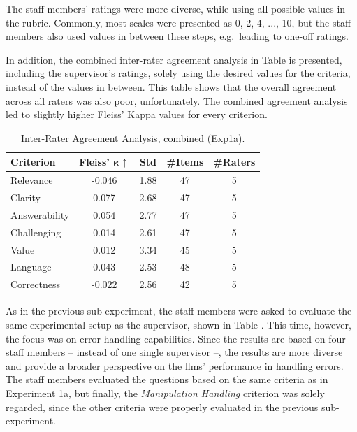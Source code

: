 \pagebreak

The staff members' ratings were more diverse, while using all possible values in the rubric. Commonly, most scales were presented as 0, 2, 4, ..., 10, but the staff members also used values in between these steps, e.g.\ leading to one-off ratings.

In addition, the combined inter-rater agreement analysis in Table  is presented, including the supervisor's ratings, solely using the desired values for the criteria, instead of the values in between. This table shows that the overall agreement across all raters was also poor, unfortunately. The combined agreement analysis led to slightly higher Fleiss' Kappa values for every criterion. 

\begin{table}[H]
   \centering
   \caption{Inter-Rater Agreement Analysis, combined (Exp1a).} 
   \label{tab:iaa-combined-1a}
   \begin{tabular}{lcccc}
        \toprule
        \textbf{Criterion} & \textbf{Fleiss' $\mathbf{\kappa}\uparrow$} & \textbf{Std} & \textbf{\#Items} & \textbf{\#Raters} \\
        \midrule
        Relevance      & -0.046 & 1.88 & 47 & 5 \\
        Clarity        &  0.077 & 2.68 & 47 & 5 \\
        Answerability  &  0.054 & 2.77 & 47 & 5 \\
        Challenging    &  0.014 & 2.61 & 47 & 5 \\
        Value          &  0.012 & 3.34 & 45 & 5 \\
        Language       &  0.043 & 2.53 & 48 & 5 \\
        Correctness    & -0.022 & 2.56 & 42 & 5 \\
        \bottomrule
   \end{tabular}
\end{table}


As in the previous sub-experiment, the staff members were asked to evaluate the same experimental setup as the supervisor, shown in Table . This time, however, the focus was on error handling capabilities. Since the results are based on four staff members -- instead of one single supervisor --, the results are more diverse and provide a broader perspective on the \acp{llm}' performance in handling errors. The staff members evaluated the questions based on the same criteria as in Experiment 1a, but finally, the \textit{Manipulation Handling} criterion was solely regarded, since the other criteria were properly evaluated in the previous sub-experiment. 


